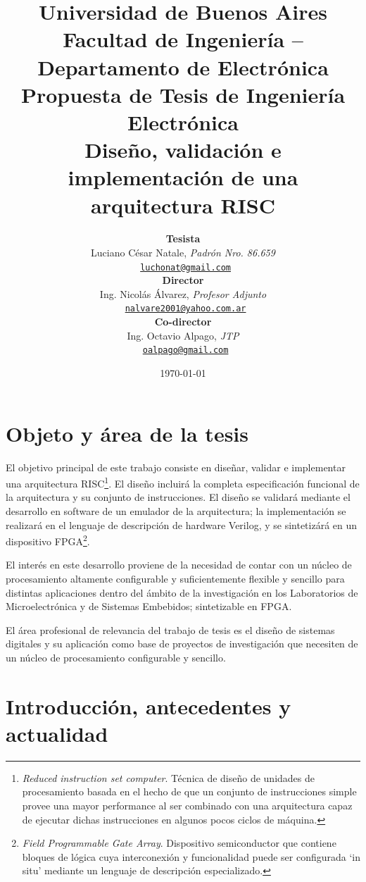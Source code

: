 \documentclass[a4paper]{article}
\title{
	{\normalsize
		Universidad de Buenos Aires\\
		Facultad de Ingeniería -- Departamento de Electrónica\\
		Propuesta de Tesis de Ingeniería Electrónica\\
		\vspace{0.7cm}
	}
	Diseño, validación e implementación de una arquitectura RISC
}
\author{	\textbf{Tesista}															\\
			Luciano César Natale, \textit{Padrón Nro. 86.659}               			\\
            \texttt{ \href{mailto:luchonat@gmail.com}{luchonat@gmail.com}}			\\[2.5ex]
            \textbf{Director}																\\
            Ing. Nicolás Álvarez, \textit{Profesor Adjunto}             				\\
            \texttt{ \href{mailto:nalvare2001@yahoo.com.ar}{nalvare2001@yahoo.com.ar}}  \\[2.5ex]
            \textbf{Co-director}															\\
            Ing. Octavio Alpago, \textit{JTP}               					\\
            \texttt{ \href{mailto:oalpago@gmail.com}{oalpago@gmail.com}}                \\[2.5ex]
       }
\date{\today}
\begin{document}
\maketitle



\thispagestyle{fancy}

\section{Objeto y área de la tesis}

El objetivo principal de este trabajo consiste en diseñar, validar e implementar una arquitectura RISC\footnote{\label{RISC} \emph{Reduced instruction set computer}. Técnica de diseño de unidades de procesamiento basada en el hecho de que un conjunto de instrucciones simple provee una mayor performance al ser combinado con una arquitectura capaz de ejecutar dichas instrucciones en algunos pocos ciclos de máquina.}. El diseño incluirá la completa especificación funcional de la arquitectura y su conjunto de instrucciones. El diseño se validará mediante el desarrollo en software de un emulador de la arquitectura; la implementación se realizará en el lenguaje de descripción de hardware Verilog, y se sintetizárá en un dispositivo FPGA\footnote{\label{FPGA} \emph{Field Programmable Gate Array}. Dispositivo semiconductor que contiene bloques de lógica cuya interconexión y funcionalidad puede ser configurada `in situ' mediante un lenguaje de descripción especializado.}.

El interés en este desarrollo proviene de la necesidad de contar con un núcleo de procesamiento altamente configurable y suficientemente flexible y sencillo para distintas aplicaciones dentro del ámbito de la investigación en los Laboratorios de Microelectrónica y de Sistemas Embebidos; sintetizable en FPGA.

El área profesional de relevancia del trabajo de tesis es el diseño de sistemas digitales y su aplicación como base de proyectos de investigación que necesiten de un núcleo de procesamiento configurable y sencillo.

\newpage

\section{Introducción, antecedentes y actualidad}
\end{document}
